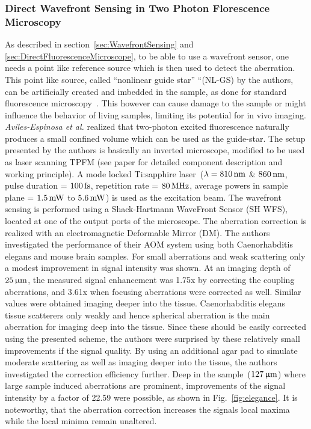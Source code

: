 \subsubsection{Direct Wavefront Sensing in Two Photon Florescence Microscopy}
\label{sec:TPFMDirect}

As described in section~\ref{sec:WavefrontSensing} and \ref{sec:DirectFluorescenceMicroscope}, to be able to use a wavefront sensor, one needs a point like reference source which is then used to detect the aberration. This point like source, called ``nonlinear guide star'' ``(NL-GS) by the authors, can be artificially created and imbedded in the sample, as done for standard fluorescence microscopy~\cite{wide_fluorescence_guide_star}. This however can cause damage to the sample or might influence the behavior of living samples, limiting its potential for in vivo imaging. \emph{Aviles-Espinosa et al.} realized that two-photon excited fluorescence naturally produces a small confined volume which can be used as the guide-star. The setup presented by the authors is basically an inverted microscope, modified to be used as laser scanning TPFM (see paper for detailed component description and working principle). A mode locked Ti:sapphire laser~($\lambda = \unit[810]{nm}$ \& $\unit[860]{nm}$, pulse duration = $\unit[100]{fs}$, repetition rate = $\unit[80]{MHz}$, average powers in sample plane = $\unit[1.5]{mW}$ to $\unit[5.6]{mW}$) is used as the excitation beam. The wavefront sensing is performed using a Shack-Hartmann WaveFront Sensor (SH WFS), located at one of the output ports of the microscope. The aberration correction is realized with an electromagnetic Deformable Mirror (DM). The authors investigated the performance of their AOM system using both Caenorhabditis elegans and mouse brain samples. For small aberrations and weak scattering only a modest improvement in signal intensity was shown. At an imaging depth of $\unit[25]{\upmu m}$, the measured signal enhancement was 1.75x by correcting the coupling aberrations, and 3.61x when focusing aberrations were corrected as well. Similar values were obtained imaging deeper into the tissue. Caenorhabditis elegans tissue scatterers only weakly and hence spherical aberration is the main aberration for imaging deep into the tissue. Since these should be easily corrected using the presented scheme, the authors were surprised by these relatively small improvements if the signal quality. By using an additional agar pad to simulate moderate scattering as well as imaging deeper into the tissue, the authors investigated the correction efficiency further. Deep in the sample~($\unit[127]{\upmu m}$) where large sample induced aberrations are prominent, improvements of the signal intensity by a factor of 22.59 were possible, as shown in Fig.~\ref{fig:elegance}. It is noteworthy, that the aberration correction increases the signals local maxima while the local minima remain unaltered. 


